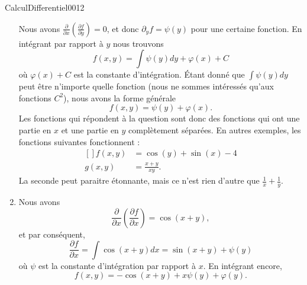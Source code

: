 \begin{corrige}{CalculDifferentiel0012}
\begin{enumerate}
			Nous avons $\frac{ \partial  }{ \partial x }\left( \frac{ \partial f }{ \partial y } \right)=0$, et donc $\partial_yf=\psi(y)$ pour une certaine fonction. En intégrant par rapport à $y$ nous trouvons
			\begin{equation}
				f(x,y)=\int\psi(y)dy+\varphi(x)+C
			\end{equation}
			où $\varphi(x)+C$ est la constante d'intégration. Étant donné que $\int\psi(y)dy$ peut être n'importe quelle fonction (nous ne sommes intéressés qu'aux fonctions $C^2$), nous avons la forme générale
			\begin{equation}
				f(x,y)=\psi(y)+\varphi(x).
			\end{equation}
            Les fonctions qui répondent à la question sont donc des fonctions qui ont une partie en \( x\) et une partie en \( y\) complètement séparées. En autres exemples, les fonctions suivantes fonctionnent :
			\begin{equation}
				\begin{aligned}[]
					f(x,y)&=\cos(y)+\sin(x)-4\\
					g(x,y)&=\frac{ x+y }{ xy }.
				\end{aligned}
			\end{equation}
			La seconde peut paraitre étonnante, mais ce n'est rien d'autre que $\frac{1}{ x }+\frac{1}{ y }$.
		\item
			Nous avons
			\begin{equation}
				\frac{ \partial  }{ \partial x }\left( \frac{ \partial f }{ \partial x } \right)=\cos(x+y),
			\end{equation}
			et par conséquent,
			\begin{equation}
				\frac{ \partial f }{ \partial x }=\int \cos(x+y)dx=\sin(x+y)+\psi(y)
			\end{equation}
			où $\psi$ est la constante d'intégration par rapport à $x$. En intégrant encore,
			\begin{equation}
				f(x,y)=-\cos(x+y)+x\psi(y)+\varphi(y).
			\end{equation}
	\end{enumerate}
\end{corrige}
